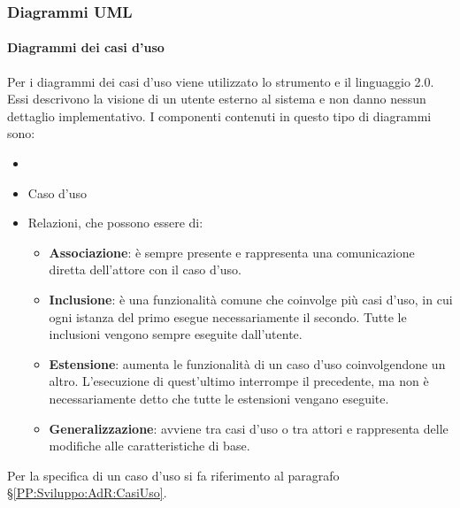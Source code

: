 		 
		\subsubsection{Diagrammi UML}\label{PP:Sviluppo:UML} %

		\paragraph{Diagrammi dei casi d'uso}\label{DiagrammiCasiUso}
		Per i diagrammi dei casi d'uso viene utilizzato lo strumento  e il linguaggio  2.0. Essi descrivono la visione di un utente esterno al sistema e non danno nessun dettaglio implementativo. I componenti contenuti in questo tipo di diagrammi sono:
		\begin{itemize}
			\item {}
			\item Caso d'uso
			\item Relazioni, che possono essere di:
			\begin{itemize}
				\item \textbf{Associazione}: è sempre presente e rappresenta una comunicazione diretta dell'attore con il caso d'uso.
				\item \textbf{Inclusione}: è una funzionalità comune che coinvolge più casi d'uso, in cui ogni istanza del primo esegue necessariamente il secondo. Tutte le inclusioni vengono sempre eseguite dall'utente.
				\item \textbf{Estensione}: aumenta le funzionalità di un caso d'uso coinvolgendone un altro. L'esecuzione di quest'ultimo interrompe il precedente, ma non è necessariamente detto che tutte le estensioni vengano eseguite.
				\item \textbf{Generalizzazione}: avviene tra casi d'uso o tra attori e rappresenta delle modifiche alle caratteristiche di base.
			\end{itemize}
		\end{itemize}
		Per la specifica di un caso d'uso si fa riferimento al paragrafo \S\ref{PP:Sviluppo:AdR:CasiUso}.


